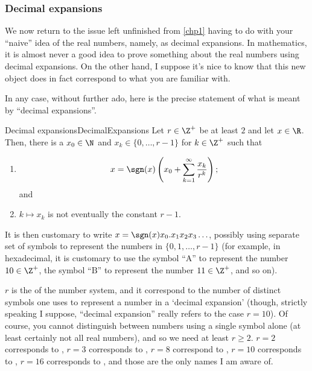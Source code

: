 \subsubsection{Decimal expansions}\label{sssDecimalExpansions}

We now return to the issue left unfinished from \cref{chp1} having to do with your ``naive'' idea of the real numbers, namely, as decimal expansions.  In mathematics, it is almost never a good idea to prove something about the real numbers using decimal expansions.  On the other hand, I suppose it's nice to know that this new object does in fact correspond to what you are familiar with.

In any case, without further ado, here is the precise statement of what is meant by ``decimal expansions''.
\begin{thm}{Decimal expansions}{DecimalExpansions}
Let $r\in \Z ^+$ be at least $2$ and let $x\in \R$.  Then, there is a $x_0\in \N$ and $x_k\in \{ 0,\ldots ,r-1\}$ for $k\in \Z ^+$ such that
\begin{enumerate}
\item \label{DecimalExpansions.i}
\begin{equation}
x=\sgn (x)\left( x_0+\sum _{k=1}^{\infty}\frac{x_k}{r^k}\right) ;
\end{equation}
and
\item \label{DecimalExpansions.ii}$k\mapsto x_k$ is not eventually the constant $r-1$.
\end{enumerate}
\begin{rmk}
It is then customary to write $x=\sgn (x)x_0.x_1x_2x_3\ldots$, possibly using separate set of symbols to represent the numbers in $\{ 0,1,\ldots ,r-1\}$ (for example, in hexadecimal, it is customary to use the symbol ``$\text{A}$'' to represent the number $10\in \Z ^+$, the symbol ``$\text{B}$'' to represent the number $11\in \Z ^+$, and so on).
\end{rmk}
\begin{rmk}
$r$ is the  of the number system, and it correspond to the number of distinct symbols one uses to represent a number in a `decimal expansion' (though, strictly speaking I suppose, ``decimal expansion'' really refers to the case $r=10$).  Of course, you cannot distinguish between numbers using a single symbol alone (at least certainly not all real numbers), and so we need at least $r\geq 2$.  $r=2$ corresponds to , $r=3$ corresponds to , $r=8$ correspond to , $r=10$ corresponds to , $r=16$ corresponds to , and those are the only names I am aware of.

\end{rmk}
\end{thm}
